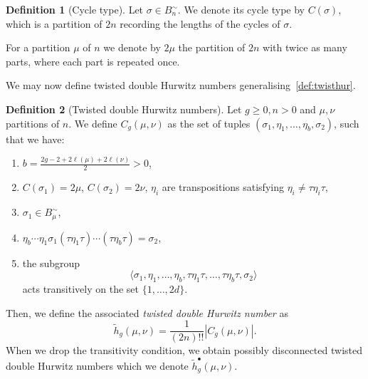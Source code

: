 \documentclass[10pt]{amsart}
\theoremstyle{plain}
\theoremstyle{definition}
\newtheorem{defi}[defi]{Definition}
\theoremstyle{definition}
\theoremstyle{plain}
\theoremstyle{plain}
\theoremstyle{remark}
\theoremstyle{plain}
\theoremstyle{plain}
\begin{document}
\begin{defi}[Cycle type]
Let $\sigma\in B^{\sim}_n$. We denote its cycle type by $C(\sigma)$, which is a partition of $2n$ recording the lengths of the cycles of $\sigma$.
\end{defi}

For a partition $\mu$ of $n$ we denote by $2\mu$ the partition of $2n$ with twice as many parts, where each part is repeated once.

We may now define twisted double Hurwitz numbers generalising~\cref{def:twisthur}.

\begin{defi}[Twisted double Hurwitz numbers]
\label{def:twisthurdou}
Let $g\ge0,n>0$ and $\mu,\nu$ partitions of $n$. We define $C_g(\mu,\nu)$ as the set of tuples $(\sigma_1,\eta_1,\dots,\eta_b,\sigma_2)$,
such that we have:
\begin{enumerate}
    \item $b=\frac{2g-2+2\ell(\mu)+2\ell(\nu)}{2}>0$,
    \item $C(\sigma_1)=2\mu$, $C(\sigma_2)=2\nu$, $\eta_i$ are transpositions satisfying $\eta_i\neq \tau \eta_i \tau$,
    \item $\sigma_1\in B^\sim_\mu$,
    \item $\eta_b\cdots\eta_1\sigma_1(\tau\eta_1\tau)\cdots(\tau\eta_b\tau)=\sigma_2$,
    \item the subgroup 
    $$\langle \sigma_1,\eta_1,\ldots,\eta_{b},\tau \eta_1\tau, \ldots,\tau\eta_b\tau,\sigma_2\rangle$$ acts transitively on the set $\{1,\ldots,2d\}$.
\end{enumerate}
Then, we define the associated \textit{twisted double Hurwitz number} as
\begin{equation*}
    \tilde{h}_{g}(\mu,\nu)=\frac{1}{(2n)!!}|C_g(\mu,\nu)|.
\end{equation*}
When we drop the transitivity condition, we obtain possibly disconnected twisted double Hurwitz numbers which we denote $\tilde{h}_{g}^\bullet(\mu,\nu)$.
\end{defi}
\end{document}
